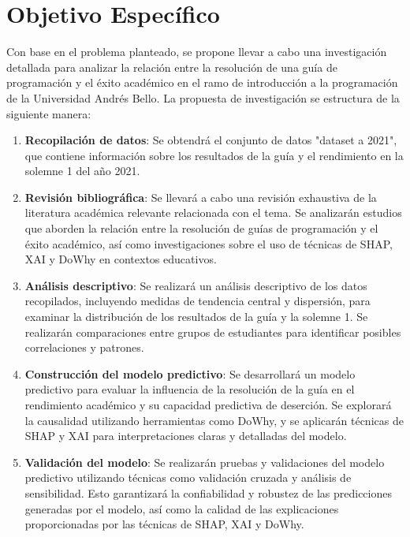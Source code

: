 \hypertarget{objetivo_especifico}{%
    \section{Objetivo Específico}\label{Objetivo Específico}}

Con base en el problema planteado, se propone llevar a cabo una investigación detallada para analizar la relación entre la resolución de una guía de programación y el éxito académico en el ramo de introducción a la programación de la Universidad Andrés Bello. La propuesta de investigación se estructura de la siguiente manera:

\begin{enumerate}
    \item \textbf{Recopilación de datos}: Se obtendrá el conjunto de datos "dataset a 2021", que contiene información sobre los resultados de la guía y el rendimiento en la solemne 1 del año 2021.

    \item \textbf{Revisión bibliográfica}: Se llevará a cabo una revisión exhaustiva de la literatura académica relevante relacionada con el tema. Se analizarán estudios que aborden la relación entre la resolución de guías de programación y el éxito académico, así como investigaciones sobre el uso de técnicas de SHAP, XAI y DoWhy en contextos educativos.

    \item \textbf{Análisis descriptivo}: Se realizará un análisis descriptivo de los datos recopilados, incluyendo medidas de tendencia central y dispersión, para examinar la distribución de los resultados de la guía y la solemne 1. Se realizarán comparaciones entre grupos de estudiantes para identificar posibles correlaciones y patrones.

    \item \textbf{Construcción del modelo predictivo}: Se desarrollará un modelo predictivo para evaluar la influencia de la resolución de la guía en el rendimiento académico y su capacidad predictiva de deserción. Se explorará la causalidad utilizando herramientas como DoWhy, y se aplicarán técnicas de SHAP y XAI para interpretaciones claras y detalladas del modelo.

    \item \textbf{Validación del modelo}: Se realizarán pruebas y validaciones del modelo predictivo utilizando técnicas como validación cruzada y análisis de sensibilidad. Esto garantizará la confiabilidad y robustez de las predicciones generadas por el modelo, así como la calidad de las explicaciones proporcionadas por las técnicas de SHAP, XAI y DoWhy.


\end{enumerate}
